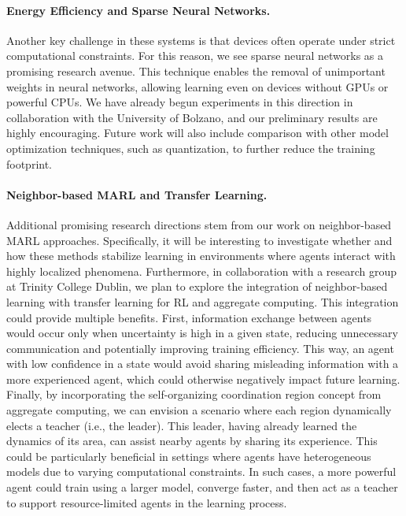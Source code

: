 \documentclass[12pt]{article}
\begin{document}
\paragraph{Energy Efficiency and Sparse Neural Networks.}
Another key challenge in these systems is that devices often operate under strict computational constraints. 
%
For this reason, we see sparse neural networks as a promising research avenue. 
%
This technique enables the removal of unimportant weights in neural networks, allowing learning even on devices without 
 GPUs or powerful CPUs. 
% 
We have already begun experiments in this direction in collaboration with the University of Bolzano, 
 and our preliminary results are highly encouraging. 
% 
Future work will also include comparison with other model optimization techniques, such as quantization, 
 to further reduce the training footprint.

\paragraph{Neighbor-based MARL and Transfer Learning.}
Additional promising research directions stem from our work on neighbor-based MARL approaches.
%
Specifically, it will be interesting to investigate whether and how these methods stabilize learning in environments 
 where agents interact with highly localized phenomena. 
% 
Furthermore, in collaboration with a research group at Trinity College Dublin, we plan to explore the integration of neighbor-based learning 
 with transfer learning for RL and aggregate computing.
%
This integration could provide multiple benefits. 
%
First, information exchange between agents would occur only when uncertainty is high in a given state, reducing unnecessary communication 
 and potentially improving training efficiency. 
% 
This way, an agent with low confidence in a state would avoid sharing misleading information with a more experienced agent, 
 which could otherwise negatively impact future learning.
%
Finally, by incorporating the self-organizing coordination region concept from aggregate computing, we can envision a scenario where 
 each region dynamically elects a teacher (i.e., the leader).
% 
This leader, having already learned the dynamics of its area, can assist nearby agents by sharing its experience. 
%
This could be particularly beneficial in settings where agents have heterogeneous models due to varying computational constraints. 
%
In such cases, a more powerful agent could train using a larger model, converge faster, and then act as a teacher to support resource-limited 
 agents in the learning process.



\end{document}
